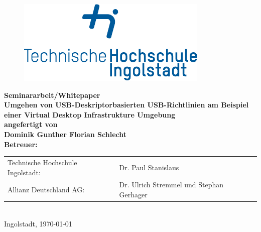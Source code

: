 
\begin{titlepage}

\phantom{tmpText}

\vspace{1cm}

\begin{figure}[h!]
\centering
\includegraphics[width=\textwidth]{bilder/thi_logo_cropped.pdf}
\end{figure}

  \begin{center}

    
    
    \textbf{{\large Seminararbeit/Whitepaper} \\[3ex]
    {\LARGE Umgehen von USB-Deskriptorbasierten USB-Richtlinien am Beispiel einer Virtual Desktop Infrastrukture Umgebung} \\[1ex]
    \vfill
    angefertigt von \\
    Dominik Gunther Florian Schlecht \\[2ex] %
    \vfill
    Betreuer:} \\%
    \begin{tabular}{ll}
      Technische Hochschule Ingolstadt: & Dr. Paul Stanislaus \\
      Allianz Deutschland AG: & Dr. Ulrich Stremmel und Stephan Gerhager
    \end{tabular} \\[2ex]
    \vfill
    Ingolstadt, \today
  \end{center}
\end{titlepage}
